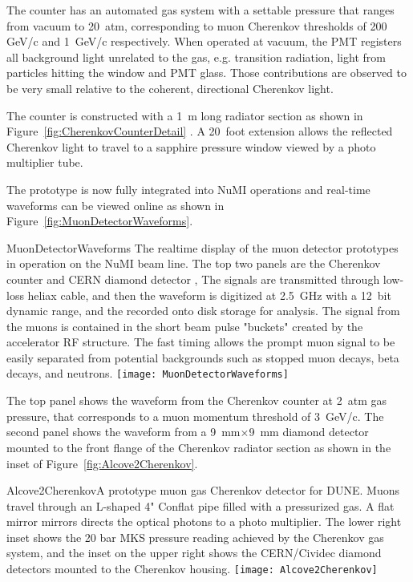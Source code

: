 The counter has an automated gas system with a settable pressure that ranges
from vacuum to 20~atm, corresponding to muon Cherenkov thresholds of 
200 GeV/c and 1~GeV/c respectively. When operated at vacuum, the PMT registers all background light
unrelated to the gas, e.g. transition radiation, light from particles hitting the window and PMT glass.
Those contributions are observed to be very small relative to the coherent, directional Cherenkov light.

The counter is constructed with a 1~m long radiator section
as shown in Figure~\ref{fig:CherenkovCounterDetail} . A 20~foot extension allows the reflected 
Cherenkov light to travel to a sapphire pressure window viewed by a photo multiplier tube.

The prototype is now fully integrated into NuMI operations and
real-time waveforms can be viewed online as shown in
Figure~\ref{fig:MuonDetectorWaveforms}. 
\begin{cdrfigure}{MuonDetectorWaveforms}
{The realtime display of the muon detector prototypes in operation 
on the NuMI beam line. The top two panels are the Cherenkov counter 
and CERN diamond detector \cite{ref:CERNdiamond}, The signals are 
transmitted through low-loss heliax cable, and then the waveform 
is digitized at 2.5~GHz with a 12~bit dynamic range, and the 
recorded onto disk storage for analysis. The signal from the 
muons is contained in the short beam pulse "buckets" created 
by the accelerator RF structure. The fast timing allows the 
prompt muon signal to be easily separated from potential backgrounds 
such as stopped muon decays, beta decays, and neutrons.}
\texttt{[image: MuonDetectorWaveforms]}
\end{cdrfigure}
The top panel shows the waveform from the Cherenkov counter at 2~atm
gas pressure, that corresponds to a muon momentum threshold of
3~GeV/c. The second panel shows the waveform from a 9~mm$\times$9~mm
diamond detector mounted to the front flange of the Cherenkov radiator
section as shown in the inset of Figure~\ref{fig:Alcove2Cherenkov}.
\begin{cdrfigure}{Alcove2Cherenkov}{A prototype muon gas Cherenkov detector for DUNE.  
Muons travel through an L-shaped 4" Conflat pipe filled with a pressurized gas. A flat mirror mirrors directs the optical photons to a photo multiplier. The lower right inset shows the 20 bar MKS pressure reading achieved by the Cherenkov gas system, and the inset on the upper right shows the CERN/Cividec diamond detectors mounted to the Cherenkov housing.}
\texttt{[image: Alcove2Cherenkov]}
\end{cdrfigure}

